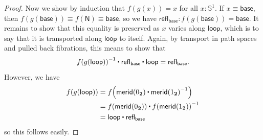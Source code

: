 \documentclass[10pt,a4paper]{article}
\newcommand{\jdeq}{\equiv}      %
\newcommand{\refl}[1]{\ensuremath{\mathsf{refl}_{#1}}\xspace}
\newcommand{\ct}{%
  \mathchoice{\mathbin{\raisebox{0.5ex}{$\displaystyle\centerdot$}}}%
             {\mathbin{\raisebox{0.5ex}{$\centerdot$}}}%
             {\mathbin{\raisebox{0.25ex}{$\scriptstyle\,\centerdot\,$}}}%
             {\mathbin{\raisebox{0.1ex}{$\scriptscriptstyle\,\centerdot\,$}}}
}
\newcommand{\opp}[1]{\mathord{{#1}^{-1}}}
\newcommand{\map}[2]{\ensuremath{{#1}\mathopen{}\left({#2}\right)\mathclose{}}\xspace}
\let\ap\map
\newcommand{\bool}{\ensuremath{\mathbf{2}}\xspace}
\newcommand{\btrue}{{1_{\bool}}}
\newcommand{\bfalse}{{0_{\bool}}}
\newcommand{\Sn}{\mathbb{S}}
\newcommand{\base}{\ensuremath{\mathsf{base}}\xspace}
\newcommand{\lloop}{\ensuremath{\mathsf{loop}}\xspace}
\newcommand{\north}{\mathsf{N}}
\newcommand{\merid}{\mathsf{merid}}
\theoremstyle{definition}
\theoremstyle{remark}
\numberwithin{equation}{section}
\begin{document}
\begin{proof}
  Now we show by induction that $f(g(x))=x$ for all $x:\Sn^1$.
  If $x\jdeq \base$, then $f(g(\base))\jdeq f(\north)\jdeq\base$, so we have $\refl{\base} : f(g(\base))=\base$.
  It remains to show that this equality is preserved as $x$ varies along $\lloop$, which is to say that it is transported along $\lloop$ to itself.
  Again, by transport in path spaces and pulled back fibrations, this means to show that
  \[ \opp{\ap f {\ap g {\lloop}}} \ct \refl{\base} \ct \lloop = \refl{\base}.\]
  However, we have
  \begin{align*}
    \ap f {\ap g {\lloop}} &= \ap f {\merid(\bfalse) \ct \opp{\merid(\btrue)}}\\
    &= \ap f {\merid(\bfalse)} \ct \opp{\ap f {\merid(\btrue)}}\\
    &= \lloop \ct \refl{\base}
  \end{align*}
  so this follows easily.
\end{proof}
\end{document}
